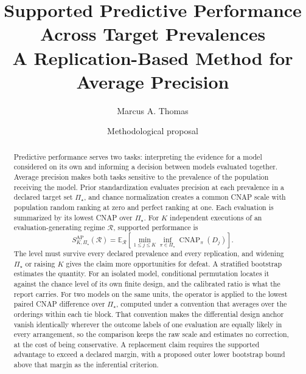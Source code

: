 \documentclass[11pt]{article}
\title{Supported Predictive Performance Across Target Prevalences\\
\large A Replication-Based Method for Average Precision}
\author{Marcus A. Thomas}
\date{Methodological proposal}
\newcommand{\CNAP}{\operatorname{CNAP}}
\newcommand{\Regime}{\mathcal{R}}
\newcommand{\PSet}{\Pi_\star}
\newcommand{\E}{\mathbb{E}}
\theoremstyle{remark}
\begin{document}
\maketitle

\begin{abstract}
Predictive performance serves two tasks: interpreting the evidence for a model considered on its own and informing a decision between models evaluated together. Average precision makes both tasks sensitive to the prevalence of the population receiving the model. Prior standardization evaluates precision at each prevalence in a declared target set $\PSet$, and chance normalization creates a common CNAP scale with population random ranking at zero and perfect ranking at one. Each evaluation is summarized by its lowest CNAP over $\PSet$. For $K$ independent executions of an evaluation-generating regime $\Regime$, supported performance is
\[
S_{K,\PSet}^{\mathrm{AP}}(\Regime)
=
\E_{\Regime}
\left[
\min_{1\leq j\leq K}
\inf_{\pi\in\PSet}\CNAP_\pi(D_j)
\right].
\]
The level must survive every declared prevalence and every replication, and widening $\PSet$ or raising $K$ gives the claim more opportunities for defeat. A stratified bootstrap estimates the quantity. For an isolated model, conditional permutation locates it against the chance level of its own finite design, and the calibrated ratio is what the report carries. For two models on the same units, the operator is applied to the lowest paired CNAP difference over $\PSet$, computed under a convention that averages over the orderings within each tie block. That convention makes the differential design anchor vanish identically wherever the outcome labels of one evaluation are equally likely in every arrangement, so the comparison keeps the raw scale and estimates no correction, at the cost of being conservative. A replacement claim requires the supported advantage to exceed a declared margin, with a proposed outer lower bootstrap bound above that margin as the inferential criterion.
\end{abstract}

\begingroup
\small
\setlength{\parskip}{0pt}
\tableofcontents
\endgroup
\end{document}
